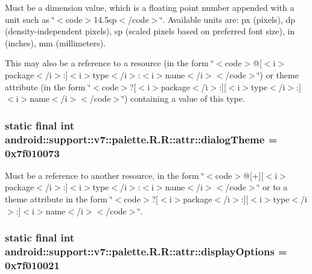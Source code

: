 Must be a dimension value, which is a floating point number appended with a unit such as \char`\"{}$<$code$>$14.5sp$<$/code$>$\char`\"{}. Available units are: px (pixels), dp (density-independent pixels), sp (scaled pixels based on preferred font size), in (inches), mm (millimeters). 

This may also be a reference to a resource (in the form \char`\"{}$<$code$>$@\mbox{[}$<$i$>$package$<$/i$>$:\mbox{]}$<$i$>$type$<$/i$>$:$<$i$>$name$<$/i$>$$<$/code$>$\char`\"{}) or theme attribute (in the form \char`\"{}$<$code$>$?\mbox{[}$<$i$>$package$<$/i$>$:\mbox{]}\mbox{[}$<$i$>$type$<$/i$>$:\mbox{]}$<$i$>$name$<$/i$>$$<$/code$>$\char`\"{}) containing a value of this type. \hypertarget{classandroid_1_1support_1_1v7_1_1palette_1_1_r_1_1attr_fda033458b65e0a41923f4f34ad15719}{
\subsubsection[{dialogTheme}]{\setlength{\rightskip}{0pt plus 5cm}static final int android::support::v7::palette.R.R::attr::dialogTheme = 0x7f010073}}
\label{classandroid_1_1support_1_1v7_1_1palette_1_1_r_1_1attr_fda033458b65e0a41923f4f34ad15719}


Must be a reference to another resource, in the form \char`\"{}$<$code$>$@\mbox{[}+\mbox{]}\mbox{[}$<$i$>$package$<$/i$>$:\mbox{]}$<$i$>$type$<$/i$>$:$<$i$>$name$<$/i$>$$<$/code$>$\char`\"{} or to a theme attribute in the form \char`\"{}$<$code$>$?\mbox{[}$<$i$>$package$<$/i$>$:\mbox{]}\mbox{[}$<$i$>$type$<$/i$>$:\mbox{]}$<$i$>$name$<$/i$>$$<$/code$>$\char`\"{}. \hypertarget{classandroid_1_1support_1_1v7_1_1palette_1_1_r_1_1attr_aaa6874d428d8a78d705ffd8e8ecac69}{
\subsubsection[{displayOptions}]{\setlength{\rightskip}{0pt plus 5cm}static final int android::support::v7::palette.R.R::attr::displayOptions = 0x7f010021}}
\label{classandroid_1_1support_1_1v7_1_1palette_1_1_r_1_1attr_aaa6874d428d8a78d705ffd8e8ecac69}


